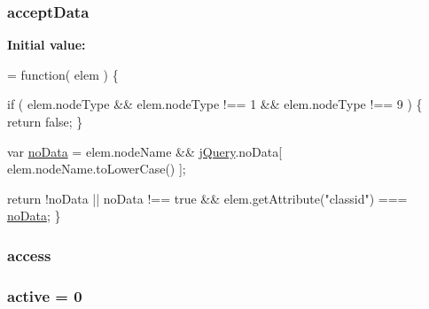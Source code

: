 \subsubsection[{accept\+Data}]{ accept\+Data}\label{jquery-1_810_82-vsdoc_8js_a7d1dabc0af68f7b43c5cc81f1e61bf29}
{\bfseries Initial value\+:}
\begin{DoxyCode}
= \textcolor{keyword}{function}( elem ) \{

        
        \textcolor{keywordflow}{if} ( elem.nodeType && elem.nodeType !== 1 && elem.nodeType !== 9 ) \{
            \textcolor{keywordflow}{return} \textcolor{keyword}{false};
        \}

        var \hyperlink{jquery-1_810_82-vsdoc_8js_ad32d84c9593cb0546704f6bd04d32386}{noData} = elem.nodeName && \hyperlink{jquery-1_810_82-vsdoc_8js_add5237586d970a38a81f990e8eb28c6c}{jQuery}.noData[ elem.nodeName.toLowerCase() ];

        
        \textcolor{keywordflow}{return} !noData || noData !== \textcolor{keyword}{true} && elem.getAttribute(\textcolor{stringliteral}{"classid"}) === 
      \hyperlink{jquery-1_810_82-vsdoc_8js_ad32d84c9593cb0546704f6bd04d32386}{noData};
    \}
\end{DoxyCode}
\hypertarget{jquery-1_810_82-vsdoc_8js_a130ad18d21e14ee566dbf4eb185f2bda}{}
\subsubsection[{access}]{ access}\label{jquery-1_810_82-vsdoc_8js_a130ad18d21e14ee566dbf4eb185f2bda}
\hypertarget{jquery-1_810_82-vsdoc_8js_ac7f6e8b6e2af70e6c0b36fc55e86f61b}{}
\subsubsection[{active}]{ active = 0}\label{jquery-1_810_82-vsdoc_8js_ac7f6e8b6e2af70e6c0b36fc55e86f61b}
\hypertarget{jquery-1_810_82-vsdoc_8js_a2f34e089948aad779d5a43c9b381caa6}{}
